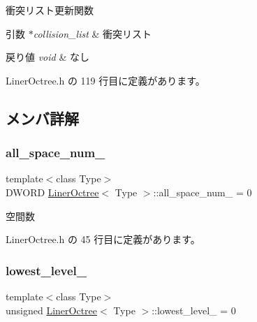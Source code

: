 衝突リスト更新関数 


\begin{DoxyParams}{引数}
{\em $\ast$collision\+\_\+list} & 衝突リスト \\
\hline
\end{DoxyParams}

\begin{DoxyRetVals}{戻り値}
{\em void} & なし \\
\hline
\end{DoxyRetVals}


 Liner\+Octree.\+h の 119 行目に定義があります。



\subsection{メンバ詳解}
\mbox{\label{class_liner_octree_aff1d6fcdf606bb2e42461714c0e7aa50}} 
\subsubsection{\texorpdfstring{all\+\_\+space\+\_\+num\+\_\+}{all\_space\_num\_}}
{\footnotesize\ttfamily template$<$class Type$>$ \\
D\+W\+O\+RD \mbox{\hyperlink{class_liner_octree}{Liner\+Octree}}$<$ Type $>$\+::all\+\_\+space\+\_\+num\+\_\+ = 0\hspace{0.3cm}{\ttfamily [private]}}



空間数 



 Liner\+Octree.\+h の 45 行目に定義があります。

\mbox{\label{class_liner_octree_aa62a6ad34ceed4a8fef93123ca45350d}} 
\subsubsection{\texorpdfstring{lowest\+\_\+level\+\_\+}{lowest\_level\_}}
{\footnotesize\ttfamily template$<$class Type$>$ \\
unsigned \mbox{\hyperlink{class_liner_octree}{Liner\+Octree}}$<$ Type $>$\+::lowest\+\_\+level\+\_\+ = 0\hspace{0.3cm}{\ttfamily [private]}}



